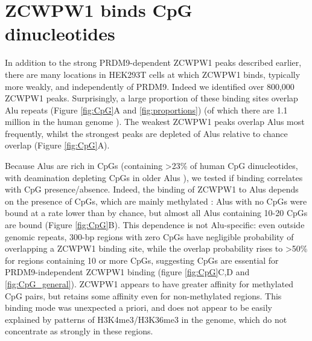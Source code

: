 \section{ZCWPW1 binds CpG dinucleotides}
In addition to the strong PRDM9-dependent ZCWPW1 peaks described earlier, there are many locations in HEK293T cells at which ZCWPW1 binds, typically more weakly, and independently of PRDM9.
Indeed we identified over 800,000 ZCWPW1 peaks.
Surprisingly, a large proportion of these binding sites overlap Alu repeats (Figure \ref{fig:CpG}A and \ref{fig:proportions}) (of which there are 1.1 million in the human genome \parencite{Deininger2011Alu}).
The weakest ZCWPW1 peaks overlap Alus most frequently, whilst the strongest peaks are depleted of Alus relative to chance overlap (Figure \ref{fig:CpG}A).

Because Alus are rich in CpGs (containing >23\% of human CpG dinucleotides, with deamination depleting CpGs in older Alus \parencite{Luo2014Dynamic}), we tested if binding correlates with CpG presence/absence.
Indeed, the binding of ZCWPW1 to Alus depends on the presence of CpGs, which are mainly methylated \parencite{Gaysinskaya2018Transient}: Alus with no CpGs were bound at a rate lower than by chance, but almost all Alus containing 10-20 CpGs are bound (Figure \ref{fig:CpG}B).
This dependence is not Alu-specific: even outside genomic repeats, 300-bp regions with zero CpGs have negligible probability of overlapping a ZCWPW1 binding site, while the overlap probability rises to >50\% for regions containing 10 or more CpGs, suggesting CpGs are essential for PRDM9-independent ZCWPW1 binding (figure \ref{fig:CpG}C,D and \ref{fig:CpG_general}).
ZCWPW1 appears to have greater affinity for methylated CpG pairs, but retains some affinity even for non-methylated regions.
This binding mode was unexpected a priori, and does not appear to be easily explained by patterns of H3K4me3/H3K36me3 in the genome, which do not concentrate as strongly in these regions.


